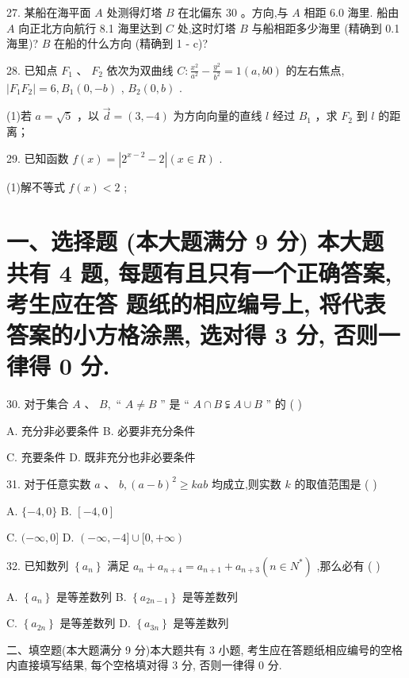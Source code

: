 \documentclass[10pt]{article}
\begin{document}
27. 某船在海平面 \(A\) 处测得灯塔 \(B\) 在北偏东 30 。方向,与 \(A\) 相距 6.0 海里. 船由 \(A\) 向正北方向航行 8.1 海里达到 \(C\) 处,这时灯塔 \(B\) 与船相距多少海里 (精确到 0.1 海里)? \(B\) 在船的什么方向 (精确到 1 - c)?

28. 已知点 \({F}_{1}\text{ 、 }{F}_{2}\) 依次为双曲线 \(C : \frac{{x}^{2}}{{a}^{2}} - \frac{{y}^{2}}{{b}^{2}} = 1\left( {a,{b0}}\right)\) 的左右焦点, \(\left| {{F}_{1}{F}_{2}}\right|  = 6,{B}_{1}\left( {0, - b}\right)\) , \({B}_{2}\left( {0,b}\right)\) .

(1)若 \(a = \sqrt{5}\) ，以 \(\overrightarrow{d} = \left( {3, - 4}\right)\) 为方向向量的直线 \(l\) 经过 \({B}_{1}\) ，求 \({F}_{2}\) 到 \(l\) 的距离；

29. 已知函数 \(f\left( x\right)  = \left| {{2}^{x - 2} - 2}\right| \left( {x \in  R}\right)\) .

(1)解不等式 \(f\left( x\right)  < 2\) ;

\section*{一、选择题 (本大题满分 9 分) 本大题共有 4 题, 每题有且只有一个正确答案, 考生应在答 题纸的相应编号上, 将代表答案的小方格涂黑, 选对得 3 分, 否则一律得 0 分.}

30. 对于集合 \(A\text{ 、 }B,\) “ \(A \neq  B\) ” 是 “ \(A \cap  B \subsetneqq  A \cup  B\) ” 的 ( )

A. 充分非必要条件 B. 必要非充分条件

C. 充要条件 D. 既非充分也非必要条件

31. 对于任意实数 \(a\text{ 、 }b,{\left( a - b\right) }^{2} \geq  {kab}\) 均成立,则实数 \(k\) 的取值范围是 ( )

A. \(\{  - 4,0\}\) B. \(\left\lbrack  {-4,0}\right\rbrack\)

C. \(( - \infty ,0\rbrack\) D. \(( - \infty , - 4\rbrack  \cup  \lbrack 0, + \infty )\)

32. 已知数列 \(\left\{  {a}_{n}\right\}\) 满足 \({a}_{n} + {a}_{n + 4} = {a}_{n + 1} + {a}_{n + 3}\left( {n \in  {N}^{ * }}\right)\) ,那么必有 ( )

A. \(\left\{  {a}_{n}\right\}\) 是等差数列 B. \(\left\{  {a}_{{2n} - 1}\right\}\) 是等差数列

C. \(\left\{  {a}_{2n}\right\}\) 是等差数列 D. \(\left\{  {a}_{3n}\right\}\) 是等差数列

二、填空题(本大题满分 9 分)本大题共有 3 小题, 考生应在答题纸相应编号的空格内直接填写结果, 每个空格填对得 3 分, 否则一律得 0 分.
\end{document}
